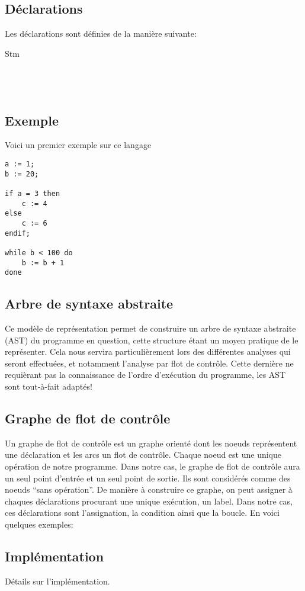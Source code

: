 \subsection{Déclarations}
Les déclarations sont définies de la manière suivante:

\begin{dtype}{Stm}
  \\
  \\
  \akind{ }\\
  \\
\end{dtype}

\subsection{Exemple}
Voici un premier exemple sur ce langage
\begin{lstlisting}
a := 1;
b := 20;

if a = 3 then
	c := 4
else
	c := 6
endif;

while b < 100 do
	b := b + 1
done
\end{lstlisting}

\subsection{Arbre de syntaxe abstraite}
Ce modèle de représentation permet de construire un arbre de syntaxe abstraite (AST) du programme en question, 
cette structure étant un moyen pratique de le représenter. Cela nous servira particulièrement lors des différentes 
analyses qui seront effectuées, et notamment l'analyse par flot de contrôle. Cette dernière ne requièrant pas 
la connaissance de l'ordre d'exécution du programme, les AST sont tout-à-fait adaptés!

\begin{center}\end{center}

\subsection{Graphe de flot de contrôle}
Un graphe de flot de contrôle est un graphe orienté dont les noeuds représentent une déclaration et les arcs un 
flot de contrôle. Chaque noeud est une unique opération de notre programme. Dans notre cas, le graphe de flot de 
contrôle aura un seul point d'entrée et un seul point de sortie. Ils sont considérés comme des noeuds ``sans opération''. 
De manière à construire ce graphe, on peut assigner à chaques déclarations procurant une unique exécution, un label. 
Dans notre cas, ces déclarations sont l'assignation, la condition ainsi que la boucle. En voici quelques exemples:

\begin{center}\end{center}

\subsection{Implémentation}
Détails sur l'implémentation.
